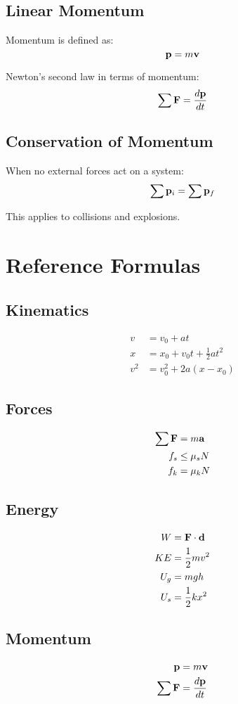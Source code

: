 \documentclass[11pt]{book}
\begin{document}
\section{Linear Momentum}

Momentum is defined as:
\[ \mathbf{p} = m\mathbf{v} \]

Newton's second law in terms of momentum:
\[ \sum \mathbf{F} = \frac{d\mathbf{p}}{dt} \]

\section{Conservation of Momentum}

When no external forces act on a system:
\[ \sum \mathbf{p}_i = \sum \mathbf{p}_f \]

This applies to collisions and explosions.

\backmatter

\appendix

\chapter{Reference Formulas}

\section{Kinematics}
\begin{align}
    v &= v_0 + at \\
    x &= x_0 + v_0 t + \frac{1}{2}at^2 \\
    v^2 &= v_0^2 + 2a(x - x_0)
\end{align}

\section{Forces}
\begin{align}
    \sum \mathbf{F} &= m\mathbf{a} \\
    f_s &\leq \mu_s N \\
    f_k &= \mu_k N
\end{align}

\section{Energy}
\begin{align}
    W &= \mathbf{F} \cdot \mathbf{d} \\
    KE &= \frac{1}{2}mv^2 \\
    U_g &= mgh \\
    U_s &= \frac{1}{2}kx^2
\end{align}

\section{Momentum}
\begin{align}
    \mathbf{p} &= m\mathbf{v} \\
    \sum \mathbf{F} &= \frac{d\mathbf{p}}{dt}
\end{align}
\end{document}
